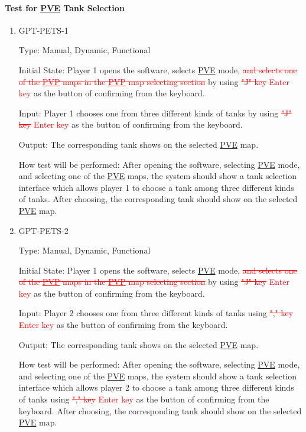 \documentclass[12pt, titlepage]{article}
\begin{document}
\paragraph{Test for \underline{PVE} Tank Selection}

\begin{enumerate}

\item{GPT-PETS-1\\}

Type: Manual, Dynamic, Functional
					
Initial State: Player 1 opens the software, selects \underline{PVE} mode, \textcolor{red}{\sout{and selects one of the \underline{PVP} maps in the \underline{PVP} map selecting section}} by using \textcolor{red}{\sout{"J" key}} \textcolor{red}{Enter key} as the button of confirming from the keyboard.
					
Input: Player 1 chooses one from three different kinds of tanks by using \textcolor{red}{\sout{"J" key}} \textcolor{red}{Enter key} as the button of confirming from the keyboard.
					
Output: The corresponding tank shows on the selected \underline{PVE} map.
					
How test will be performed: After opening the software, selecting \underline{PVE} mode, and selecting one of the \underline{PVE} maps, the system should show a tank selection interface which allows player 1 to choose a tank among three different kinds of tanks. After choosing, the corresponding tank should show on the selected \underline{PVE} map.

\item{GPT-PETS-2\\}

Type: Manual, Dynamic, Functional
					
Initial State: Player 1 opens the software, selects \underline{PVE} mode, \textcolor{red}{\sout{and selects one of the \underline{PVP} maps in the \underline{PVP} map selecting section}} by using \textcolor{red}{\sout{"J" key}} \textcolor{red}{Enter key} as the button of confirming from the keyboard.
					
Input: Player 2 chooses one from three different kinds of tanks using \textcolor{red}{\sout{"," key}} \textcolor{red}{Enter key} as the button of confirming from the keyboard.
					
Output: The corresponding tank shows on the selected \underline{PVE} map.
					
How test will be performed: After opening the software, selecting \underline{PVE} mode, and selecting one of the \underline{PVE} maps, the system should show a tank selection interface which allows player 2 to choose a tank among three different kinds of tanks using \textcolor{red}{\sout{"," key}} \textcolor{red}{Enter key} as the button of confirming from the keyboard. After choosing, the corresponding tank should show on the selected \underline{PVE} map.

\end{enumerate}
\end{document}
